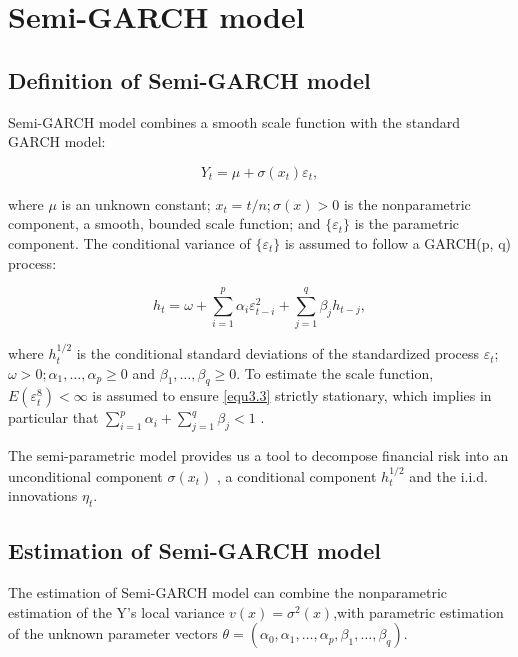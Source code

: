 \section{Semi-GARCH model}

\subsection{Definition of Semi-GARCH model}

Semi-GARCH model combines a smooth scale function with the standard GARCH model:

\begin{equation}
\label{eq:3.1}
Y_{t} = \mu + \sigma(x_{t})\varepsilon_{t},
\end{equation}

where $\mu$ is an unknown constant; $x_{t}=t/n; \sigma(x)>0$ is the nonparametric component, a smooth, bounded scale function; and $\lbrace\varepsilon_{t}\rbrace$ is the parametric component. The conditional variance of $\lbrace\varepsilon_{t}\rbrace$ is assumed to follow a GARCH(p, q) process:

\begin{equation}
\label{equ3.3}
h_{t}=\omega + \sum_{i=1}^{p}\alpha_{i}\varepsilon_{t-i}^{2} + \sum_{j=1}^{q}\beta_{j}h_{t-j},
\end{equation}

where $h_t^{1/2}$ is the conditional standard deviations of the standardized process $\varepsilon_t$; $ \omega>0;  \alpha_{1}, \ldots ,\alpha_{p}\geq0$ and $\beta_{1},\ldots,\beta_{q}\geq0$.    To estimate the scale function, $E(\varepsilon_{t}^{8})<\infty$ is assumed to ensure \ref{equ3.3} strictly stationary, which implies in particular that $\sum_{i=1}^p\alpha_i+\sum_{j=1}^q\beta_j<1$ \citep{Feng2004}.

The semi-parametric model provides us a tool to decompose financial risk into an unconditional component $\sigma(x_t)$ , a conditional component $h_{t}^{1/2}$  and the i.i.d. innovations $\eta_{t}$.

\subsection{Estimation of Semi-GARCH model}
\label{subsec3.1.2}
The estimation of Semi-GARCH model can combine the nonparametric estimation of the Y's local variance  $v(x)=\sigma^{2}(x)$,with parametric estimation of the unknown parameter vectors $\theta = (\alpha_{0},\alpha_{1},\ldots,\alpha_{p},\beta_{1},\ldots,\beta_{q})$.

